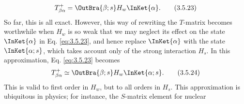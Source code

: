\begin{equation}
 T^+_{\beta\alpha}=\OutBra{\beta;s}H_w\InKet{\alpha}.
 \tag{3.5.23}\label{eq:3.5.23}
\end{equation}
So far, this is all exact. However, this way of rewriting the $T$-matrix becomes worthwhile when
$H_w$ is so weak that we may neglect its effect on the state $\InKet{\alpha}$ in
Eq. \eqref{eq:3.5.23}, and hence replace $\InKet{\alpha}$ with the state
$\InKet{\alpha;s}$, which takes account only of the strong interaction $H_s$. In this
approximation, Eq. \eqref{eq:3.5.23} becomes
\begin{equation}
 T^+_{\beta\alpha}\simeq
 \OutBra{\beta;s}H_w\InKet{\alpha;s}.
 \tag{3.5.24}\label{eq:3.5.24}
\end{equation}
This is valid to first order in $H_w$, but to all orders in $H_s$. This approximation is ubiquitous
in physics; for instance, the $S$-matrix element for nuclear
